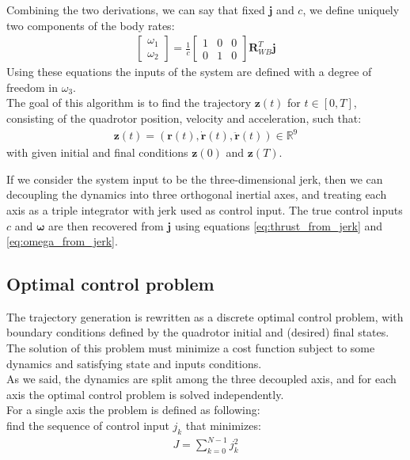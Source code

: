Combining the two derivations, we can say that fixed $\boldsymbol{j}$ and $c$, we define uniquely two components of the body rates:
\begin{align}
{\begin{bmatrix}
\omega_1 \\[10pt]
\omega_2
\end{bmatrix}}  = \frac{1}{c}
{\begin{bmatrix}
1 & 0 & 0  \\[10pt]
0 & 1 & 0
\end{bmatrix}}\boldsymbol{R}_{WB}^T \boldsymbol{j}
\label{eq:omega_from_jerk}
\end{align}
Using these equations the inputs of the system are defined with a degree of freedom in $\omega_3$.\\

The goal of this algorithm is to find  the trajectory $\boldsymbol{z}(t)$ for $t \in [0,T]$, consisting of the quadrotor position, velocity and acceleration, such that:
\begin{align}
\boldsymbol{z}(t) = (\boldsymbol{r}(t),\dot{\boldsymbol{r}}(t),\ddot{\boldsymbol{r}}(t)) \in \mathbb{R}^9
\end{align}
with given initial and final conditions $\boldsymbol{z}(0)$ and $\boldsymbol{z}(T)$.

If we consider the system input to be the three-dimensional jerk, then we can decoupling the dynamics into three orthogonal inertial axes, and treating each axis as a triple integrator with jerk used as control input. The true control inputs $c$ and $\boldsymbol{\omega}$ are then recovered from $\boldsymbol{j}$  using equations \ref{eq:thrust_from_jerk} and \ref{eq:omega_from_jerk}.


\subsection{Optimal control problem}
The trajectory generation is rewritten as a discrete optimal control problem, with boundary conditions defined by the quadrotor initial and (desired) final states. The solution of this problem must minimize a cost function subject to some dynamics and satisfying state and inputs conditions.\\

As we said, the dynamics are split among the three decoupled axis, and for each axis the optimal control problem is  solved independently.\\

For a single axis the problem is defined as following:\\
find the sequence of control input $j_k$ that minimizes:
\begin{align}
J = \sum_{k=0}^{N-1} j_k^2
\end{align}

